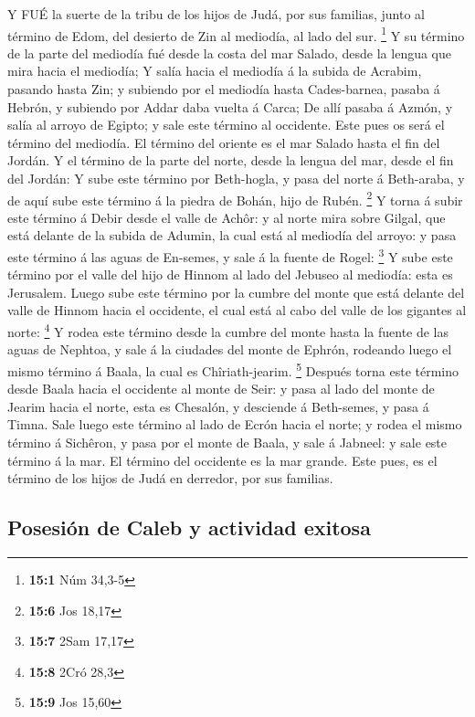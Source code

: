  Y FUÉ la suerte de la tribu de los hijos de Judá, por sus
familias, junto al término de Edom, del desierto de Zin al mediodía, al
lado del sur. \footnote{\textbf{15:1} Núm 34,3-5}  Y su
término de la parte del mediodía fué desde la costa del mar Salado,
desde la lengua que mira hacia el mediodía;  Y salía hacia
el mediodía á la subida de Acrabim, pasando hasta Zin; y subiendo por el
mediodía hasta Cades-barnea, pasaba á Hebrón, y subiendo por Addar daba
vuelta á Carca;  De allí pasaba á Azmón, y salía al arroyo
de Egipto; y sale este término al occidente. Este pues os será el
término del mediodía.  El término del oriente es el mar
Salado hasta el fin del Jordán. Y el término de la parte del norte,
desde la lengua del mar, desde el fin del Jordán:  Y sube
este término por Beth-hogla, y pasa del norte á Beth-araba, y de aquí
sube este término á la piedra de Bohán, hijo de Rubén. \footnote{\textbf{15:6}
  Jos 18,17}  Y torna á subir este término á Debir desde el
valle de Achôr: y al norte mira sobre Gilgal, que está delante de la
subida de Adumin, la cual está al mediodía del arroyo: y pasa este
término á las aguas de En-semes, y sale á la fuente de Rogel:
\footnote{\textbf{15:7} 2Sam 17,17}  Y sube este término por
el valle del hijo de Hinnom al lado del Jebuseo al mediodía: esta es
Jerusalem. Luego sube este término por la cumbre del monte que está
delante del valle de Hinnom hacia el occidente, el cual está al cabo del
valle de los gigantes al norte: \footnote{\textbf{15:8} 2Cró 28,3}
 Y rodea este término desde la cumbre del monte hasta la
fuente de las aguas de Nephtoa, y sale á la ciudades del monte de
Ephrón, rodeando luego el mismo término á Baala, la cual es
Chîriath-jearim. \footnote{\textbf{15:9} Jos 15,60} 
Después torna este término desde Baala hacia el occidente al monte de
Seir: y pasa al lado del monte de Jearim hacia el norte, esta es
Chesalón, y desciende á Beth-semes, y pasa á Timna.  Sale
luego este término al lado de Ecrón hacia el norte; y rodea el mismo
término á Sichêron, y pasa por el monte de Baala, y sale á Jabneel: y
sale este término á la mar.  El término del occidente es la
mar grande. Este pues, es el término de los hijos de Judá en derredor,
por sus familias.

\hypertarget{posesiuxf3n-de-caleb-y-actividad-exitosa}{%
\subsection{Posesión de Caleb y actividad
exitosa}\label{posesiuxf3n-de-caleb-y-actividad-exitosa}}

